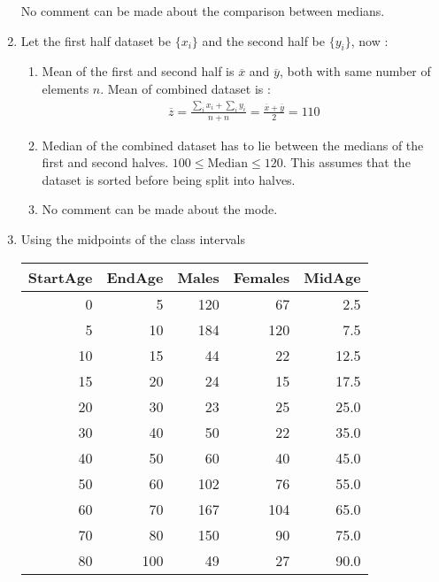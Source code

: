 \begin{enumerate}
	
	No comment can be made about the comparison between medians.
	
	\item Let the first half dataset be $ \{x_i\} $ and the second half be $ \{y_i\} $, now : 
	\begin{enumerate}
		\item Mean of the first and second half is $\overline{x}$ and $ \overline{y} $, both with same number of elements $ n $. Mean of combined dataset is : 
		\begin{align}
			\overline{z} = \frac{\sum_{i} x_i + \sum_{i} y_i}{n + n} = \frac{\overline{x} + \overline{y}}{2} = 110
		\end{align}
		
		\item Median of the combined dataset has to lie between the medians of the first and second halves. $ 100 \leq \text{Median}  \leq 120 $. This assumes that the dataset is sorted before being split into halves.
		
		\item No comment can be made about the mode.
	\end{enumerate}
	
	\item Using the midpoints of the class intervals
	\begin{table}[H]
		\centering
		\begin{tabular}{rrrrr}
			\toprule
			StartAge &  EndAge &  Males &  Females &  MidAge \\
			\midrule
			0 &       5 &    120 &       67 &     2.5 \\
			5 &      10 &    184 &      120 &     7.5 \\
			10 &      15 &     44 &       22 &    12.5 \\
			15 &      20 &     24 &       15 &    17.5 \\
			20 &      30 &     23 &       25 &    25.0 \\
			30 &      40 &     50 &       22 &    35.0 \\
			40 &      50 &     60 &       40 &    45.0 \\
			50 &      60 &    102 &       76 &    55.0 \\
			60 &      70 &    167 &      104 &    65.0 \\
			70 &      80 &    150 &       90 &    75.0 \\
			80 &     100 &     49 &       27 &    90.0 \\
			\bottomrule
		\end{tabular}
	\end{table}
	

\end{enumerate}
